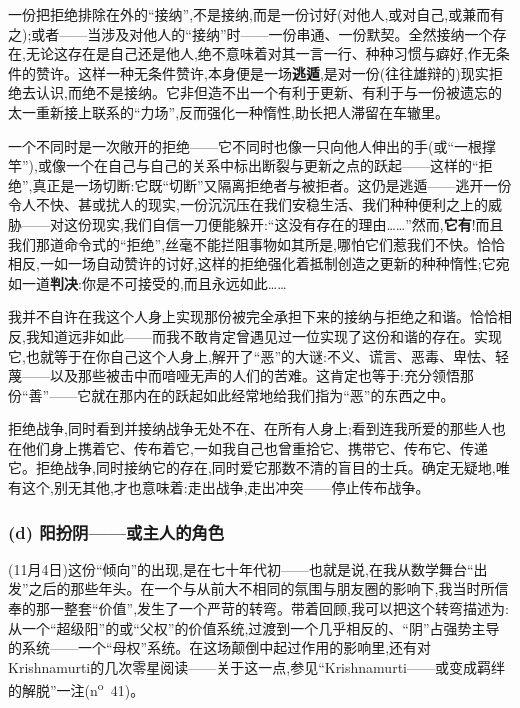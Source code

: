 一份把拒绝排除在外的“接纳”,不是接纳,而是一份讨好(对他人,或对自己,或兼而有之);或者——当涉及对他人的“接纳”时——一份串通、一份默契。全然接纳一个存在,无论这存在是自己还是他人,绝不意味着对其一言一行、种种习惯与癖好,作\dmark{}无条件的赞许。这样一种无条件赞许,本身便是一场\textbf{逃遁},是对一份(往往雄辩的)现实拒绝去认识,而绝不是接纳。它非但造不出一个有利于更新、有利于与一份被遗忘的太一重新接上联系的“力场”,反而强化一种惰性,助长把人滞留在车辙里。

一个不同时是一次敞开的拒绝——它不同时也像一只向他人伸出的手(或“一根撑竿”),或像一个在自己与自己的关系中标出断裂与更新之点的跃起——这样的“拒绝”,真正是一场切断:它既“切断”又隔离拒绝者与被拒者。这仍是逃遁——逃开一份令人不快、甚或扰人的现实,一份沉沉压在我们安稳生活、我们种种便利之上的威胁——对这份现实,我们自信一刀便能躲开:“这没有存在的理由……”然而,\textbf{它有}!而且我们那道命令式的“拒绝”,丝毫不能拦阻事物如其所是,哪怕它们惹我们不快。恰恰相反,一如一场自动赞许的讨好,这样的拒绝强化着抵制创造之更新的种种惰性;它宛如一道\textbf{判决}:你是不可接受的,而且永远如此……

我并不自许在我这个人身上实现那份被完全承担下来的接纳与拒绝之和谐。恰恰相反,我知道远非如此——而我不敢肯定曾遇见过一位实现了这份和谐的存在。实现它,也就等于在你自己这个人身上,解开了“恶”的大谜:不义、谎言、恶毒、卑怯、轻蔑——以及那些被击中而喑哑无声的人们的苦难。这肯定也等于:充分领悟那份“善”——它就在那内在的跃起如此经常地给我们指为“恶”的东西之中。

拒绝战争,同时看到并接纳战争无处不在、在所有人身上;看到连我所爱的那些人也在他们身上携着它、传布着它,一如我自己也曾重拾它、携带它、传布它、传递它。拒绝战争,同时接纳它的存在,同时爱它那数不清的盲目的士兵。确定无疑地,唯有这个,别无其他,才也意味着:走出战争,走出冲突——停止传布战争。

\subsubsection*{(d) 阳扮阴——或主人的角色}
\label{ch18:local:h25}

\label{ch18:local:n22}

\dmark{}(11月4日)这份“倾向”的出现,是在七十年代初——也就是说,在我从数学舞台“出发”之后的那些年头。在一个与从前大不相同的氛围与朋友圈的影响下,我当时所信奉的那一整套“价值”,发生了一个严苛的转弯。带着回顾,我可以把这个转弯描述为:从一个“超级阳”的或“父权”的价值系统,过渡到一个几乎相反的、“阴”占强势主导的系统——一个“母权”系统。在这场颠倒中起过作用的影响里,还有对Krishnamurti的几次零星阅读——关于这一点,参见“Krishnamurti——或变成羁绊的解脱”一注(n\textsuperscript{o}~41)。

